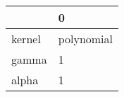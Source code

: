 \begin{tabular}{ll}
\toprule
{} &           0 \\
\midrule
kernel &  polynomial \\
gamma  &           1 \\
alpha  &           1 \\
\bottomrule
\end{tabular}
